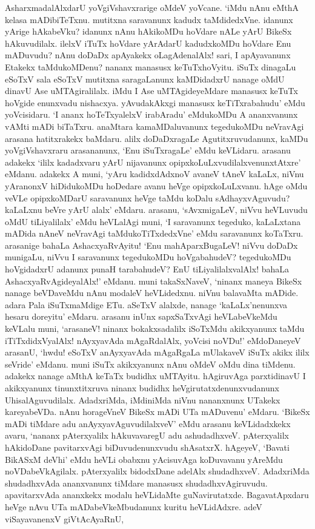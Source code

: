 AsharxmadalAlxdarU yoVgiVshavxrarige oMdeV yoVcane. `iMdu nAnu eMthA kelasa mADibiTeTxnu. mutitxna saravanunx kadudx taMdidedxVne. idanunx yArige hAkabeVku? idanunx nAnu hAkikoMDu hoVdare nALe yArU BikeSx hAkuvudilalx. ilelxV iTuTx hoVdare yArAdarU kadudxkoMDu hoVdare Enu mADuvudu? nAnu doDaDx apAyakekx oLagAdenalAlx! sari, I apAyavanunx Etakekx taMdukoMDenu? nananx manasusx keTuTxhoVyitu. iSuTx dinagaLu eSoTxV sala eSoTxV mutitxna saragaLanunx kaMDidadxrU nanage oMdU dinavU Ase uMTAgiralilalx. iMdu I Ase uMTAgideyeMdare manasusx keTuTx hoVgide enunxvadu nishacxya. yAvudakAkxgi manasusx keTiTxrabahudu' eMdu yoVcisidaru. `I ananx hoTeTxyalelxV irabAradu' eMdukoMDu A ananxvanunx vAMti mADi biTaTxru. anaMtara kamaMDaluvanunx tegedukoMDu neVravAgi arasana hatitxrakekx baMdaru. alilx doDaDxragaLe Agutitxruvudanunx, kaMDu yoVgiVshavxraru arasananunx, `Enu iSuTxragaLe' eMdu keVLidaru. arasanu adakekx `ililx kadadxvaru yArU nijavanunx opipxkoLuLxvudilalxvenunxtAtxre' eMdanu. adakekx A muni, `yAru kadidxdAdxnoV avaneV tAneV kaLaLx, niVnu yAranonxV hiDidukoMDu hoDedare avanu heVge opipxkoLuLxvanu. hAge oMdu veVLe opipxkoMDarU saravanunx heVge taMdu koDalu sAdhayxvAguvudu? kaLaLxnu beVre yArU alalx' eMdaru. arasanu, `sAvxmigaLeV, niVvu heVLuvudu oMdU tiLiyalilalx' eMdu heVLalAgi muni, `I saravanunx tegeduko, kaLaLxtana mADida nAneV neVravAgi taMdukoTiTxdedxVne' eMdu saravanunx koTaTxru. arasanige bahaLa AshacxyaRvAyitu! `Enu mahAparxBugaLeV! niVvu doDaDx munigaLu, niVvu I saravanunx tegedukoMDu hoVgabahudeV? tegedukoMDu hoVgidadxrU adanunx punaH tarabahudeV? EnU tiLiyalilalxvalAlx! bahaLa AshacxyaRvAgideyalAlx!' eMdanu. muni takaSxNaveV, `ninanx maneya BikeSx nanage beVDaveMdu nAnu modaleV heVLidedxnu. niVnu balavaMta mADide. adara Pala iSuTxmaMdige ETu. aSeTxV alalxde, nanage `kaLaLx'nenunxva hesaru doreyitu' eMdaru. arasanu inUnx sapxSaTxvAgi heVLabeVkeMdu keVLalu muni, `arasaneV! ninanx bokakxsadalilx iSoTxMdu akikxyanunx taMdu iTiTxdidxVyalAlx! nAyxyavAda mAgaRdalAlx, yoVcisi noVDu!' eMdoDaneyeV arasanU, `hwdu! eSoTxV anAyxyavAda mAgaRgaLa mUlakaveV iSuTx akikx ililx seVride' eMdanu. muni iSuTx akikxyanunx nAnu oMdeV oMdu dina tiMdenu. adakekx nanage aMthA keTaTx budidhx uMTAyitu. hAgiruvAga parxtidinavU I akikxyanunx tinunxtitxruva ninanx budidhx heVgirutatxdenunxvudanunx UhisalAguvudilalx. AdadxriMda, iMdiniMda niVnu nananxnunx UTakekx kareyabeVDa. nAnu horageVneV BikeSx mADi UTa mADuvenu' eMdaru. `BikeSx mADi tiMdare adu anAyxyavAguvudilalxveV' eMdu arasanu keVLidadxkekx avaru, `nananx pAterxyalilx hAkuvavaregU adu ashudadhxveV. pAterxyalilx hAkidoDane pavitarxvAgi biDuvudenunxvudu shAsatxrX. hAgeyeV, `Bavati BikASxM deVhi' eMdu heVLi obabxnu yAcisuvAga koDuvavanu yAreMdu noVDabeVkAgilalx. pAterxyalilx bidodxDane adelAlx shudadhxveV. AdadxriMda shudadhxvAda ananxvanunx tiMdare manasusx shudadhxvAgiruvudu. apavitarxvAda ananxkekx modalu heVLidaMte guNavirutatxde. BagavatApxdaru heVge nAvu UTa mADabeVkeMbudanunx kuritu heVLidAdxre. adeV viSayavanenxV giVtAcAyaRnU,

